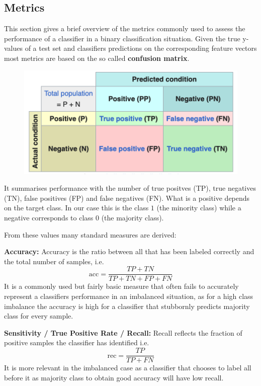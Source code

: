 
\subsection{Metrics}

This section gives a brief overview of the metrics commonly used to assess the performance of a classifier in a binary classification situation.
Given the true y-values of a test set and classifiers predictions on the corresponding feature vectors most metrics are based on the so called \textbf{confusion matrix}.

\begin{figure}[H]
	\centering
  	\includegraphics[width=\linewidth]{assets/confusion_matrix.png}
  	\label{fig:confusion_matrix}
\end{figure}

It summarises performance with the number of true positves (TP), true negatives (TN), false positives (FP) and false negatives (FN). 
What is a positive depends on the target class. In our case this is the class $1$ (the minority class) while a negative corresponds to class $0$ (the majority class).

From these values many standard measures are derived:

\textbf{Accuracy:}
Accuracy is the ratio between all that has been labeled correctly and the total number of samples, i.e.
\[
	\text{acc} = \frac{TP + TN}{TP + TN + FP + FN}
\]
It is a commonly used but fairly basic measure that often fails to accurately represent a classifiers performance in an imbalanced situation,
as for a high class imbalance the accuracy is high for a classifier that stubbornly predicts majority class for every sample.

\textbf{Sensitivity / True Positive Rate / Recall:}
Recall reflects the fraction of positive samples the classifier has identified i.e.
\[
	\text{rec} = \frac{TP}{TP + FN}
\]
It is more relevant in the imbalanced case as a classifier that chooses to label all before it as majority class to obtain good accuracy will have low recall.

